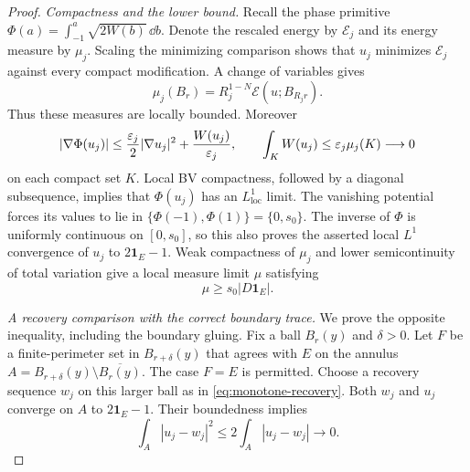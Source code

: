 \begin{proof}
\emph{Compactness and the lower bound.}
Recall the phase primitive
$\Phi(a)=\int_{-1}^a\sqrt{2W(b)}\,\dd b$.
Denote the rescaled energy by $\mathcal E_j$ and its energy measure by
$\mu_j$.  Scaling the minimizing comparison shows that $u_j$ minimizes
$\mathcal E_j$ against every compact modification.  A change of variables
gives
\begin{equation}
 \mu_j(B_r)=R_j^{1-N}\mathcal E(u;B_{R_jr}).
 \label{eq:monotone-rescaled-energy}
\end{equation}
Thus these measures are locally bounded.  Moreover
\[
 |\nabla\Phi(u_j)|
   \le \frac{\varepsilon_j}2|\nabla u_j|^2+\frac{W(u_j)}{\varepsilon_j},
 \qquad \int_K W(u_j)\le\varepsilon_j\mu_j(K)\longrightarrow0
\]
on each compact set $K$.  Local BV compactness, followed by a diagonal
subsequence, implies that $\Phi(u_j)$ has an $L^1_{\mathrm{loc}}$
limit.  The vanishing potential forces its values to lie in
$\{\Phi(-1),\Phi(1)\}=\{0,s_0\}$.  The inverse of $\Phi$ is
uniformly continuous on $[0,s_0]$, so this also proves the asserted
local $L^1$ convergence of $u_j$ to $2\mathbf1_E-1$.  Weak compactness
of $\mu_j$ and lower semicontinuity
of total variation give a local measure limit $\mu$ satisfying
\begin{equation}
 \mu\ge s_0|D\mathbf1_E|.
 \label{eq:monotone-perimeter-lower}
\end{equation}

\emph{A recovery comparison with the correct boundary trace.}
We prove the opposite inequality, including the boundary gluing.  Fix a
ball $B_r(y)$ and $\delta>0$.  Let $F$ be a finite-perimeter set in
$B_{r+\delta}(y)$ that agrees with $E$ on the annulus
$A=B_{r+\delta}(y)\setminus\overline{B_r(y)}$.  The case $F=E$
is permitted.  Choose a recovery sequence $w_j$ on this larger ball as
in \eqref{eq:monotone-recovery}.  Both $w_j$ and $u_j$ converge on $A$
to $2\mathbf1_E-1$.  Their boundedness implies
\begin{equation}
 \int_A|u_j-w_j|^2\le2\int_A|u_j-w_j|\longrightarrow0.
 \label{eq:monotone-annulus-mismatch}
\end{equation}


\end{proof}
